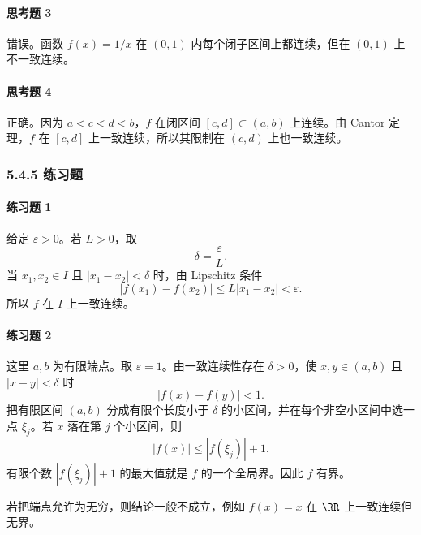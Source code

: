 \paragraph{思考题 3}
\begin{xsolution}
错误。函数 $f(x)=1/x$ 在 $(0,1)$ 内每个闭子区间上都连续，但在 $(0,1)$ 上不一致连续。
\end{xsolution}

\paragraph{思考题 4}
\begin{xsolution}
正确。因为 $a<c<d<b$，$f$ 在闭区间 $[c,d]\subset(a,b)$ 上连续。由 Cantor 定理，$f$ 在 $[c,d]$ 上一致连续，所以其限制在 $(c,d)$ 上也一致连续。
\end{xsolution}

\subsubsection*{5.4.5 练习题}

\paragraph{练习题 1}
\begin{xsolution}
给定 $\varepsilon>0$。若 $L>0$，取
\[
 \delta=\frac\varepsilon L.
\]
当 $x_1,x_2\in I$ 且 $|x_1-x_2|<\delta$ 时，由 Lipschitz 条件
\[
 |f(x_1)-f(x_2)|\le L|x_1-x_2|<\varepsilon.
\]
所以 $f$ 在 $I$ 上一致连续。
\end{xsolution}

\paragraph{练习题 2}
\begin{xsolution}
这里 $a,b$ 为有限端点。取 $\varepsilon=1$。由一致连续性存在 $\delta>0$，使 $x,y\in(a,b)$ 且 $|x-y|<\delta$ 时
\[
 |f(x)-f(y)|<1.
\]
把有限区间 $(a,b)$ 分成有限个长度小于 $\delta$ 的小区间，并在每个非空小区间中选一点 $\xi_j$。若 $x$ 落在第 $j$ 个小区间，则
\[
 |f(x)|\le |f(\xi_j)|+1.
\]
有限个数 $|f(\xi_j)|+1$ 的最大值就是 $f$ 的一个全局界。因此 $f$ 有界。

若把端点允许为无穷，则结论一般不成立，例如 $f(x)=x$ 在 $\RR$ 上一致连续但无界。
\end{xsolution}

